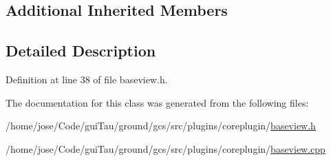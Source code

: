 \subsection*{Additional Inherited Members}


\subsection{Detailed Description}


Definition at line 38 of file baseview.\-h.



The documentation for this class was generated from the following files\-:\begin{DoxyCompactItemize}
\item 
/home/jose/\-Code/gui\-Tau/ground/gcs/src/plugins/coreplugin/\hyperlink{baseview_8h}{baseview.\-h}\item 
/home/jose/\-Code/gui\-Tau/ground/gcs/src/plugins/coreplugin/\hyperlink{baseview_8cpp}{baseview.\-cpp}\end{DoxyCompactItemize}
